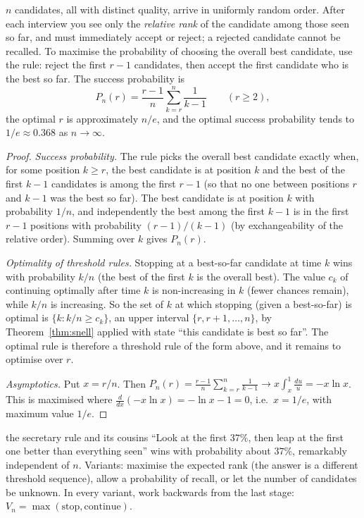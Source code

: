\begin{theorem}\label{thm:secretary}
$n$ candidates, all with distinct quality, arrive in uniformly random order. After each
interview you see only the \emph{relative rank} of the candidate among those seen so far, and
must immediately accept or reject; a rejected candidate cannot be recalled. To maximise the
probability of choosing the overall best candidate, use the rule: reject the first $r-1$
candidates, then accept the first candidate who is the best so far. The success probability is
\[
P_n(r)=\frac{r-1}n\sum_{k=r}^n\frac1{k-1}\qquad(r\ge2),
\]
the optimal $r$ is approximately $n/e$, and the optimal success probability tends to
$1/e\approx0.368$ as $n\to\infty$.
\end{theorem}
\begin{proof}
\emph{Success probability.} The rule picks the overall best candidate exactly when, for some
position $k\ge r$, the best candidate is at position $k$ and the best of the first $k-1$
candidates is among the first $r-1$ (so that no one between positions $r$ and $k-1$ was
the best so far). The best candidate is at position $k$ with probability $1/n$, and
independently the best among the first $k-1$ is in the first $r-1$ positions with probability
$(r-1)/(k-1)$ (by exchangeability of the relative order). Summing over $k$ gives $P_n(r)$.

\emph{Optimality of threshold rules.} Stopping at a best-so-far candidate at time $k$ wins with
probability $k/n$ (the best of the first $k$ is the overall best). The value $c_k$ of
continuing optimally after time $k$ is non-increasing in $k$ (fewer chances remain), while
$k/n$ is increasing. So the set of $k$ at which stopping (given a best-so-far) is optimal is
$\{k:k/n\ge c_k\}$, an upper interval $\{r,r+1,\dots,n\}$, by
Theorem~\ref{thm:snell} applied with state ``this candidate is best so far''. The optimal rule
is therefore a threshold rule of the form above, and it remains to optimise over $r$.

\emph{Asymptotics.} Put $x=r/n$. Then
$P_n(r)=\frac{r-1}n\sum_{k=r}^n\frac1{k-1}\to x\int_x^1\frac{du}u=-x\ln x$. This is maximised
where $\frac d{dx}(-x\ln x)=-\ln x-1=0$, i.e.\ $x=1/e$, with maximum value $1/e$.
\end{proof}

\begin{interview}{the secretary rule and its cousins}
``Look at the first $37\%$, then leap at the first one better than everything seen'' wins
with probability about $37\%$, remarkably independent of $n$. Variants: maximise the expected
rank (the answer is a different threshold sequence), allow a probability of recall, or let
the number of candidates be unknown. In every variant, work backwards from the last stage:
$V_n=\max(\text{stop},\text{continue})$.
\end{interview}

